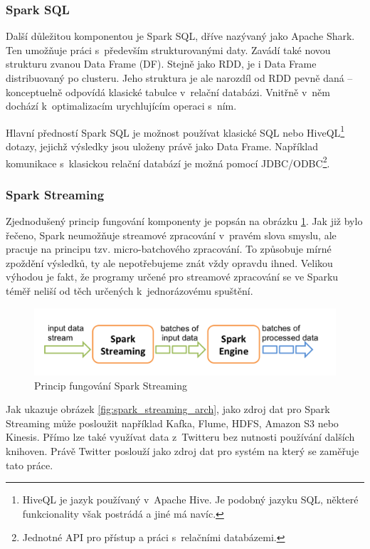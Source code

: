 \documentclass[thesis=B,czech]{FITthesis}[2012/06/26]
\begin{document}
\subsubsection{Spark SQL}
	Další důležitou komponentou je Spark SQL, dříve nazývaný jako Apache Shark. Ten umožňuje práci s~především strukturovanými daty. Zavádí také novou strukturu zvanou Data Frame (DF). Stejně jako RDD, je i Data Frame distribuovaný po clusteru. Jeho struktura je ale narozdíl od RDD pevně daná -- konceptuelně odpovídá klasické tabulce v~relační databázi. Vnitřně v~něm dochází k~optimalizacím urychlujícím operaci s~ním. 
	
	Hlavní předností Spark SQL je možnost používat klasické SQL nebo HiveQL\footnote{HiveQL je jazyk používaný v~Apache Hive. Je podobný jazyku SQL, některé funkcionality však postrádá a jiné má navíc. } dotazy, jejichž výsledky jsou uloženy právě jako Data Frame. Například komunikace s~klasickou relační databází je možná pomocí JDBC/ODBC\footnote{Jednotné API pro přístup a práci s~relačními databázemi.}. 


\subsubsection{Spark Streaming}
	Zjednodušený princip fungování komponenty je popsán na obrázku \ref{fig:spark_streaming_flow}. Jak již bylo řečeno, Spark neumožňuje streamové zpracování v~pravém slova smyslu, ale pracuje na principu tzv. micro-batchového zpracování. To způsobuje mírné zpoždění výsledků, ty ale nepotřebujeme znát vždy opravdu ihned. Velikou výhodou je fakt, že programy určené pro streamové zpracování se ve Sparku téměř neliší od těch určených k~jednorázovému spuštění. 

	\begin{figure}[ht]
    	\centering
    	\includegraphics[width=1\textwidth]{images/spark-streaming-flow.png}
    	\caption{Princip fungování Spark Streaming\cite{streaming-guide}}
    	\label{fig:spark_streaming_flow}
	\end{figure}
	
	Jak ukazuje obrázek \ref{fig:spark_streaming_arch}, jako zdroj dat pro Spark Streaming může posloužit například Kafka, Flume, HDFS, Amazon S3 nebo Kinesis. Přímo lze také využívat data z~Twitteru bez nutnosti používání dalších knihoven. Právě Twitter poslouží jako zdroj dat pro systém na který se zaměřuje tato práce.  
\end{document}
